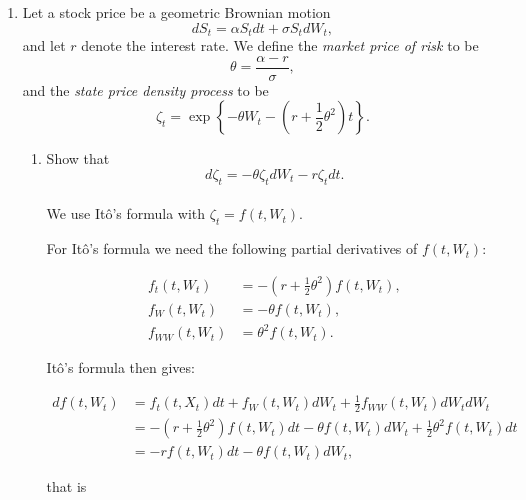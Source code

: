 \documentclass[handout,8pt]{beamer}
\begin{document}
\begin{frame}[allowframebreaks]{ }
\begin{enumerate}
    
    \item Let a stock price be a geometric Brownian motion
    \begin{equation*}
        dS_t= \alpha S_t dt + \sigma S_t dW_t,
    \end{equation*}
    and let $r$ denote the interest rate. We define the \textit{market price of risk} to be
    \begin{equation*}
        \theta = \frac{\alpha -r}{\sigma},
    \end{equation*}
    and the \textit{state price density process} to be
    \begin{equation*}
        \zeta_t = \exp\left\{-\theta W_t -\left(r + \frac{1}{2}\theta^2\right) t\right\}.
    \end{equation*}
    
    \begin{enumerate}
        \item Show that
        \begin{equation*}
            d\zeta_t = -\theta \zeta_t dW_t - r\zeta_t dt.
        \end{equation*}\\
        We use Itô's formula with $\zeta_t=f(t,W_t)$. \newline
        
        For Itô's formula we need the following partial derivatives of $f(t,W_t)$:
        
        \begin{align*}
            f_t(t,W_t) &= -\left(r+\frac{1}{2}\theta^2\right) f(t,W_t),\\
            f_W(t,W_t) &= -\theta f(t,W_t),\\
            f_{WW}(t,W_t) &= \theta^2 f(t,W_t).
        \end{align*}
        
        \newpage
        
        Itô's formula then gives:
        
        \begin{align*}
            df(t,W_t) &= f_t(t,X_t) dt + f_W(t,W_t) dW_t + \frac{1}{2}f_{WW}(t,W_t) dW_tdW_t\\
            &= - \left(r + \frac{1}{2}\theta^2\right) f(t,W_t) dt - \theta f(t,W_t) dW_t + \frac{1}{2}\theta^2 f(t,W_t) dt\\
            &= -rf(t,W_t) dt - \theta f(t,W_t) dW_t,
        \end{align*}
        
        that is
        

\end{enumerate}
\end{enumerate}
\end{frame}
\end{document}
